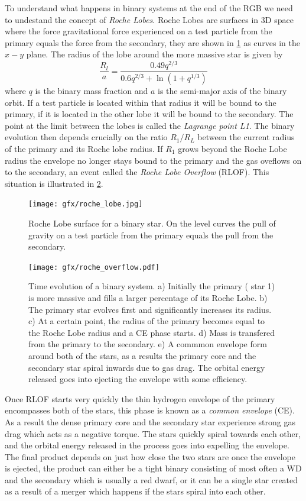 \documentclass[ twoside,openright,titlepage,numbers=noenddot,headinclude,%
                footinclude=true,cleardoublepage=empty,abstractoff, %
                BCOR=5mm,paper=a4,fontsize=11pt,%
                american,%
                ]{scrreprt}
\begin{document}
To understand what happens in binary systems at the end of the RGB we need to
undestand the concept of \emph{Roche Lobes}. Roche Lobes are surfaces in
3D space where the force gravitational force experienced on a test 
particle from the primary equals the force from the secondary, they are shown
in \cref{fig:roche_lobe} as curves in the $x-y$ plane. The radius of the lobe
around the more massive star is given by
\begin{equation}
    \frac{R_l}{a} = \frac{0.49q^{2/3}}{0.6q^{2/3} + \ln{(1+q^{1/3})}}
\end{equation}
where $q$ is the binary mass fraction and $a$ is the semi-major axis of the
binary orbit. If a test particle is located within that radius it will be bound
to the primary, if it is located in the other lobe it will be bound to the
secondary. The point at the limit between the lobes is called the 
\emph{Lagrange point L1}. The binary evolution then depends crucially on the
ratio $R_1/R_L$ between the current radius of the primary and its 
Roche lobe radius. If $R_1$ grows beyond the Roche Lobe radius the envelope
no longer stays bound to the primary and the gas oveflows on to the secondary,
an event called the \emph{Roche Lobe Overflow} (RLOF). 
This situation is illustrated in \cref{fig:roche_overflow}. 
\begin{figure}[t!]
\centering
\texttt{[image: gfx/roche\_lobe.jpg]}
\caption{Roche Lobe surface for a binary star. On the level curves the pull
    of gravity on a test particle from the primary equals the pull from the 
    secondary.}
\label{fig:roche_lobe}
\end{figure}
\begin{figure}[htb]
\centering
\texttt{[image: gfx/roche\_overflow.pdf]}
    \caption{Time evolution of a binary system. a) Initially the primary (
    star 1) is 
    more massive and fills a larger percentage of its Roche Lobe. b) The 
    primary star evolves first and significantly increases its radius. c) At
    a certain point, the radius of the primary becomes equal to the Roche Lobe
    radius and a CE phase starts. d) Mass is transfered from the primary
    to the secondary. e) A commmon envelope form around both of the stars, as
    a results the primary core and the secondary star spiral inwards due to
    gas drag. The orbital energy released goes into ejecting the envelope with
    some efficiency.}
\label{fig:roche_overflow}
\end{figure}

Once RLOF starts very quickly the thin hydrogen envelope of the primary
encompasses both of the stars, this phase is known as a \emph{common envelope}
(CE). As a result the dense primary core and
the secondary star experience strong gas drag which acts as a negative torque.
The stars quickly spiral towards each other, and the orbital energy released
in the process goes into expelling the envelope. The final product depends
on just how close the two stars are once the envelope is ejected, the product
can either be a tight binary consisting of most often a WD and the secondary
which is usually a red dwarf, or it can be a single star created as a result
of a merger which happens if the stars spiral into each other. 
\end{document}
